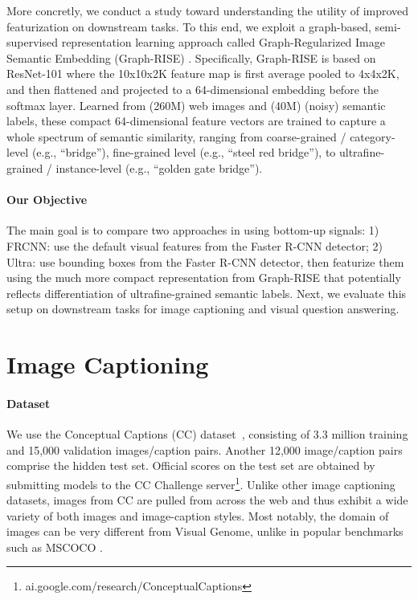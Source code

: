\documentclass[11pt,a4paper]{article}
\begin{document}
More concretly, we conduct a study toward understanding the utility of improved featurization on downstream tasks.
To this end, we exploit a graph-based, semi-supervised representation learning approach called Graph-Regularized Image Semantic Embedding (Graph-RISE) \cite{juan19graphrise}.
Specifically, Graph-RISE is based on ResNet-101 where the 10x10x2K feature map is first average pooled to 4x4x2K,
and then flattened and projected to a 64-dimensional embedding before the softmax layer.
Learned from (260M) web images and (40M) (noisy) semantic labels,
these compact 64-dimensional feature vectors are trained to capture a whole spectrum of semantic similarity,
ranging from coarse-grained / category-level (e.g., ``bridge''), fine-grained level (e.g., ``steel red bridge''),
to ultrafine-grained / instance-level (e.g., ``golden gate bridge'').

\paragraph{Our Objective}
The main goal is to compare two approaches in using bottom-up signals:
1) FRCNN: use the default visual features from the Faster R-CNN detector;
2) Ultra: use bounding boxes from the Faster R-CNN detector, then featurize them using the much more compact representation from Graph-RISE that potentially reflects differentiation of ultrafine-grained semantic labels.
Next, we evaluate this setup on downstream tasks for image captioning and visual question answering.

 \section{Image Captioning}
\label{sec:ic}

\paragraph{Dataset}
We use the Conceptual Captions (CC) dataset~\cite{sharma2018conceptual}, consisting of 3.3 million training and 15,000 validation images/caption pairs.
Another 12,000 image/caption pairs comprise the hidden test set.
Official scores on the test set are obtained by submitting models to the CC Challenge server\footnote{ai.google.com/research/ConceptualCaptions}.
Unlike other image captioning datasets, images from CC are pulled from across the web and thus exhibit a wide variety of both images and image-caption styles.
Most notably, the domain of images can be very different from Visual Genome, unlike in popular benchmarks such as MSCOCO \cite{coco}.
\end{document}
